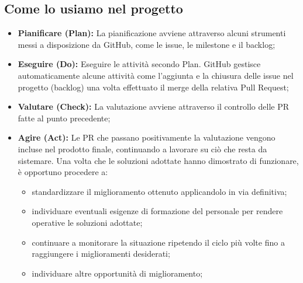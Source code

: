 \subsection{Come lo usiamo nel progetto}
\begin{itemize}
    \item \textbf{Pianificare (Plan):} La pianificazione avviene attraverso alcuni strumenti messi a disposizione da GitHub, come le issue, le milestone e il backlog; 
    \item \textbf{Eseguire (Do):} Eseguire le attività secondo Plan. GitHub gestisce automaticamente alcune attività come l'aggiunta e la chiusura delle issue nel progetto (backlog) una volta effettuato il merge della relativa Pull Request; 
    \item \textbf{Valutare (Check):} La valutazione avviene attraverso il controllo delle PR fatte al punto precedente;
    \item \textbf{Agire (Act):} Le PR che passano positivamente la valutazione vengono incluse nel prodotto finale, continuando a lavorare su ciò che resta da sistemare. Una volta che le soluzioni adottate hanno dimostrato di funzionare, è opportuno procedere a:
    \begin{itemize}
    \item standardizzare il miglioramento ottenuto applicandolo in via definitiva;
    \item individuare eventuali esigenze di formazione del personale per rendere operative le soluzioni adottate;
    \item continuare a monitorare la situazione ripetendo il ciclo più volte fino a raggiungere i miglioramenti desiderati;
    \item individuare altre opportunità di miglioramento;
    \end{itemize}
\end{itemize}

